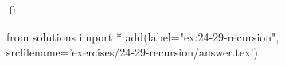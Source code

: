 
\begin{ex}
  \label{ex:24-29-recursion}
  
  \qed
\end{ex}
\begin{python0}
from solutions import *
add(label="ex:24-29-recursion",
    srcfilename='exercises/24-29-recursion/answer.tex')
\end{python0}
